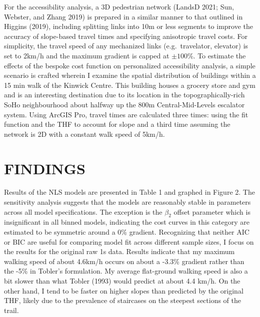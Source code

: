 \documentclass{article}
\begin{document}
For the accessibility analysis, a 3D pedestrian network (LandsD 2021;
Sun, Webster, and Zhang 2019) is prepared in a similar manner to that
outlined in Higgins (2019), including splitting links into 10m or less
segments to improve the accuracy of slope-based travel times and
specifying anisotropic travel costs. For simplicity, the travel speed of
any mechanized links (e.g.~travelator, elevator) is set to 2km/h and the
maximum gradient is capped at \(\pm{100}\)\%. To estimate the effects of
the bespoke cost function on personalized accessibility analysis, a
simple scenario is crafted wherein I examine the spatial distribution of
buildings within a 15 min walk of the Kinwick Centre. This building
houses a grocery store and gym and is an interesting destination due to
its location in the topographically-rich SoHo neighbourhood about
halfway up the 800m Central-Mid-Levels escalator system. Using ArcGIS
Pro, travel times are calculated three times: using the fit function and
the THF to account for slope and a third time assuming the network is 2D
with a constant walk speed of 5km/h.

\hypertarget{findings}{%
\section{FINDINGS}\label{findings}}

Results of the NLS models are presented in Table 1 and graphed in Figure
2. The sensitivity analysis suggests that the models are reasonably
stable in parameters across all model specifications. The exception is
the \(\beta_2\) offset parameter which is insignificant in all binned
models, indicating the cost curves in this category are estimated to be
symmetric around a 0\% gradient. Recognizing that neither AIC or BIC are
useful for comparing model fit across different sample sizes, I focus on
the results for the original raw 1s data. Results indicate that my
maximum walking speed of about 4.6km/h occurs on about a -3.3\% gradient
rather than the -5\% in Tobler's formulation. My average flat-ground
walking speed is also a bit slower than what Tobler (1993) would predict
at about 4.4 km/h. On the other hand, I tend to be faster on higher
slopes than predicted by the original THF, likely due to the prevalence
of staircases on the steepest sections of the trail.

 
  \providecommand{\huxb}[2]{\arrayrulecolor[RGB]{#1}\global\arrayrulewidth=#2pt}
  \providecommand{\huxvb}[2]{\color[RGB]{#1}\vrule width #2pt}
  \providecommand{\huxtpad}[1]{\rule{0pt}{#1}}
  \providecommand{\huxbpad}[1]{\rule[-#1]{0pt}{#1}}
\end{document}
